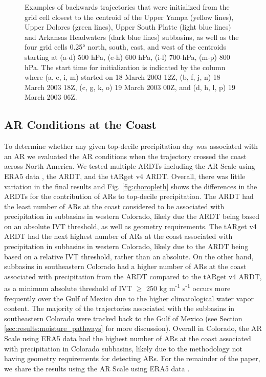 \documentclass[draft]{agujournal2019}
\begin{document}
\begin{figure}
\caption{Examples of backwards trajectories that were initialized from the grid cell closest to the centroid of the Upper Yampa (yellow lines), Upper Dolores (green lines), Upper South Platte (light blue lines) and Arkansas Headwaters (dark blue lines) subbasins, as well as the four grid cells 0.25° north, south, east, and west of the centroids starting at (a-d) 500 hPa, (e-h) 600 hPa, (i-l) 700-hPa, (m-p) 800 hPa. The start time for initialization is indicated by the column where (a, e, i, m) started on 18 March 2003 12Z, (b, f, j, n) 18 March 2003 18Z, (c, g, k, o) 19 March 2003 00Z, and (d, h, l, p) 19 March 2003 06Z. }
\label{fig:sensitivity_tests}
\end{figure}

\subsection{AR Conditions at the Coast}
\label{sec:methods:ar_conditions}
To determine whether any given top-decile precipitation day was associated with an AR we evaluated the AR conditions when the trajectory crossed the coast across North America. We tested multiple ARDTs including the AR Scale using ERA5 data \cite{MartinRalph2019}, the  ARDT, and the  tARget v4 ARDT. Overall, there was little variation in the final results and Fig. \ref{fig:choropleth} shows the differences in the ARDTs for the contribution of ARs to top-decile precipitation. The  ARDT had the least number of ARs at the coast considered to be associated with precipitation in subbasins in western Colorado, likely due the ARDT being based on an absolute IVT threshold, as well as geometry requirements. The \cite{Guan2024AERA5} tARget v4 ARDT had the next highest number of ARs at the coast associated with precipitation in subbasins in western Colorado, likely due to the ARDT being based on a relative IVT threshold, rather than an absolute. On the other hand, subbasins in southeastern Colorado had a higher number of ARs at the coast associated with precipitation from the  ARDT compared to the \cite{Guan2024AERA5} tARget v4 ARDT, as a minimum absolute threshold of IVT $\geq$ 250 kg m\textsuperscript{-1} s\textsuperscript{-1} occurs more frequently over the Gulf of Mexico due to the higher climatological water vapor content. The majority of the trajectories associated with the subbasins in southeastern Colorado were tracked back to the Gulf of Mexico (see Section \ref{sec:results:moisture_pathways} for more discussion). Overall in Colorado, the AR Scale using ERA5 data \cite{MartinRalph2019} had the highest number of ARs at the coast associated with precipitation in Colorado subbasins, likely due to the methodology not having geometry requirements for detecting ARs. For the remainder of the paper, we share the results using the AR Scale using ERA5 data \cite{MartinRalph2019}.
\end{document}
